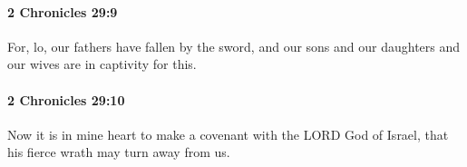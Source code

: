 		\paragraph{2 Chronicles 29:9} %
			\label{2CHRONICLES-29-9}

			For, lo, our fathers have fallen by the sword, and our sons and our daughters and our wives are in captivity for this.


		\paragraph{2 Chronicles 29:10} %
			\label{2CHRONICLES-29-10}

			Now it is in mine heart to make a covenant with the LORD God of Israel, that his fierce wrath may turn away from us.


